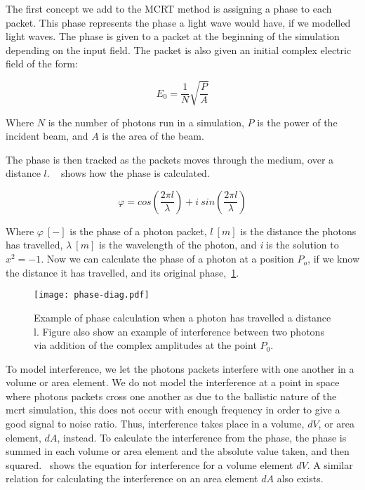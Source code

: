 The first concept we add to the MCRT method is assigning a phase to each packet.
This phase represents the phase a light wave would have, if we modelled light waves.
The phase is given to a packet at the beginning of the simulation depending on the input field.
The packet is also given an initial complex electric field of the form:

\begin{equation}
E_0 = \frac{1}{N}\sqrt{\frac{P}{A}}
\label{eqn:initefield}
\end{equation}

Where $N$ is the number of photons run in a simulation, $P$ is the power of the incident beam, and $A$ is the area of the beam.

The phase is then tracked as the packets moves through the medium, over a distance $l$.
~ shows how the phase is calculated.

\begin{equation}
    \varphi = cos\left(\frac{2 \pi l}{\lambda}\right) + i\ sin\left(\frac{2 \pi l}{\lambda}\right)
    \label{eqn:phase}
\end{equation}

Where $\varphi~[-]$ is the phase of a photon packet, $l\ [m]$ is the distance the photons has travelled, $\lambda~[m]$ is the wavelength of the photon, and \textit{i} is the solution to $x^2=-1$.
Now we can calculate the phase of a photon at a position $P_o$, if we know the distance it has travelled, and its original phase,~\cref{fig:phase-diag}.

\begin{figure}[!ht]
    \centering
    \texttt{[image: phase-diag.pdf]}
    \caption{Example of phase calculation when a photon has travelled a distance l. Figure also show an example of interference between two photons via addition of the complex amplitudes at the point $P_0$.}
    \label{fig:phase-diag}
\end{figure}

To model interference, we let the photons packets interfere with one another in a volume or area element. 
We do not model the interference at a point in space where photons packets cross one another as due to the ballistic nature of the \gls*{mcrt} simulation, this does not occur with enough frequency in order to give a good signal to noise ratio. 
Thus, interference takes place in a volume, $dV$, or area element, $dA$, instead.
To calculate the interference from the phase, the phase is summed in each volume or area element and the absolute value taken, and then squared.~ shows the equation for interference for a volume element $dV$. A similar relation for calculating the interference on an area element $dA$ also exists.

